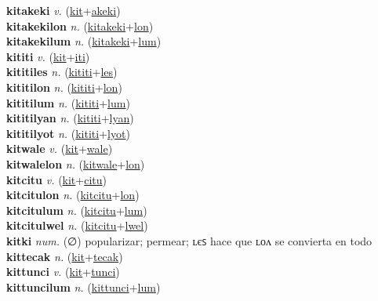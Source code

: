 \textbf{kitakeki} \textit{v.} (\hyperref[kit]{kit}+\hyperref[akeki]{akeki})
 \label{kitakeki} \\
\textbf{kitakekilon} \textit{n.} (\hyperref[kitakeki]{kitakeki}+\hyperref[lon]{lon})
 \label{kitakekilon} \\
\textbf{kitakekilum} \textit{n.} (\hyperref[kitakeki]{kitakeki}+\hyperref[lum]{lum})
 \label{kitakekilum} \\
\textbf{kititi} \textit{v.} (\hyperref[kit]{kit}+\hyperref[iti]{iti})
 \label{kititi} \\
\textbf{kititiles} \textit{n.} (\hyperref[kititi]{kititi}+\hyperref[les]{les})
 \label{kititiles} \\
\textbf{kititilon} \textit{n.} (\hyperref[kititi]{kititi}+\hyperref[lon]{lon})
 \label{kititilon} \\
\textbf{kititilum} \textit{n.} (\hyperref[kititi]{kititi}+\hyperref[lum]{lum})
 \label{kititilum} \\
\textbf{kititilyan} \textit{n.} (\hyperref[kititi]{kititi}+\hyperref[lyan]{lyan})
 \label{kititilyan} \\
\textbf{kititilyot} \textit{n.} (\hyperref[kititi]{kititi}+\hyperref[lyot]{lyot})
 \label{kititilyot} \\
\textbf{kitwale} \textit{v.} (\hyperref[kit]{kit}+\hyperref[wale]{wale})
 \label{kitwale} \\
\textbf{kitwalelon} \textit{n.} (\hyperref[kitwale]{kitwale}+\hyperref[lon]{lon})
 \label{kitwalelon} \\
\textbf{kitcitu} \textit{v.} (\hyperref[kit]{kit}+\hyperref[citu]{citu})
 \label{kitcitu} \\
\textbf{kitcitulon} \textit{n.} (\hyperref[kitcitu]{kitcitu}+\hyperref[lon]{lon})
 \label{kitcitulon} \\
\textbf{kitcitulum} \textit{n.} (\hyperref[kitcitu]{kitcitu}+\hyperref[lum]{lum})
 \label{kitcitulum} \\
\textbf{kitcitulwel} \textit{n.} (\hyperref[kitcitu]{kitcitu}+\hyperref[lwel]{lwel})
 \label{kitcitulwel} \\
\textbf{kitki} \textit{num.} (∅)
popularizar; permear; ʟєꜱ hace que ʟᴏᴧ se convierta en todo \label{kitki} \\
\textbf{kittecak} \textit{n.} (\hyperref[kit]{kit}+\hyperref[tecak]{tecak})
 \label{kittecak} \\
\textbf{kittunci} \textit{v.} (\hyperref[kit]{kit}+\hyperref[tunci]{tunci})
 \label{kittunci} \\
\textbf{kittuncilum} \textit{n.} (\hyperref[kittunci]{kittunci}+\hyperref[lum]{lum})

